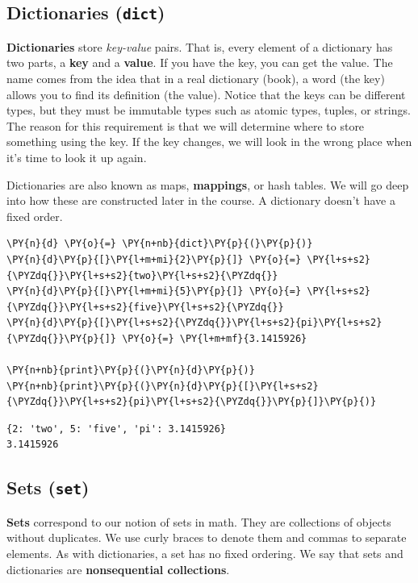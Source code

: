 \subsection{Dictionaries (\texttt{dict})}


\textbf{Dictionaries} store \emph{key-value} pairs.  That is, every element of a dictionary has two parts, a \textbf{key} and a \textbf{value}.  If you have the key, you can get the value.  The name comes from the idea that in a real dictionary (book), a word (the key) allows you to find its definition (the value).  Notice that the keys can be different types, but they must be immutable types such as atomic types, tuples, or strings.  The reason for this requirement is that we will determine where to store something using the key.  If the key changes, we will look in the wrong place when it's time to look it up again.


Dictionaries are also known as maps,  \textbf{mappings}, or hash tables.  We will go deep into how these are constructed later in the course.
A dictionary doesn't have a fixed order.


\begin{Verbatim}[commandchars=\\\{\}]
\PY{n}{d} \PY{o}{=} \PY{n+nb}{dict}\PY{p}{(}\PY{p}{)}
\PY{n}{d}\PY{p}{[}\PY{l+m+mi}{2}\PY{p}{]} \PY{o}{=} \PY{l+s+s2}{\PYZdq{}}\PY{l+s+s2}{two}\PY{l+s+s2}{\PYZdq{}}
\PY{n}{d}\PY{p}{[}\PY{l+m+mi}{5}\PY{p}{]} \PY{o}{=} \PY{l+s+s2}{\PYZdq{}}\PY{l+s+s2}{five}\PY{l+s+s2}{\PYZdq{}}
\PY{n}{d}\PY{p}{[}\PY{l+s+s2}{\PYZdq{}}\PY{l+s+s2}{pi}\PY{l+s+s2}{\PYZdq{}}\PY{p}{]} \PY{o}{=} \PY{l+m+mf}{3.1415926}

\PY{n+nb}{print}\PY{p}{(}\PY{n}{d}\PY{p}{)}
\PY{n+nb}{print}\PY{p}{(}\PY{n}{d}\PY{p}{[}\PY{l+s+s2}{\PYZdq{}}\PY{l+s+s2}{pi}\PY{l+s+s2}{\PYZdq{}}\PY{p}{]}\PY{p}{)}
\end{Verbatim}

\begin{Verbatim}
{2: 'two', 5: 'five', 'pi': 3.1415926}
3.1415926

\end{Verbatim}

\subsection{Sets (\texttt{set})}


\textbf{Sets} correspond to our notion of sets in math.  They are collections of objects without duplicates.  We use curly braces to denote them and commas to separate elements.  As with dictionaries, a set has no fixed ordering.  We say that sets and dictionaries are \textbf{nonsequential collections}.


